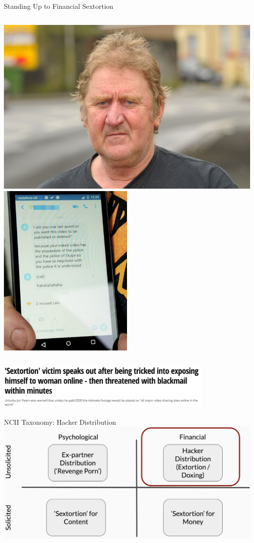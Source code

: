 \documentclass[nobackground,dvipsnames,table,aspectratio=169]{beamer}
\begin{document}
\begin{frame}{Standing Up to Financial Sextortion}
    \begin{columns}
            \centering
            \includegraphics[width=\textwidth]{jon-pearn}
            \centering
            \includegraphics[width=0.5\textwidth]{jon-pearn-texts}
    \end{columns}
    \centering
    \includegraphics[width=0.8\textwidth]{jon-pearn-headline}
\end{frame}

\begin{frame}{NCII Taxonomy: Hacker Distribution}
    \includegraphics[width=\textwidth]{ncii-taxonomy-4}
\end{frame}
\end{document}
